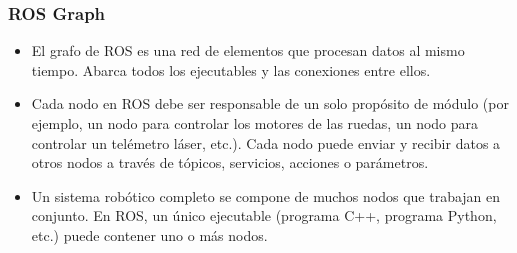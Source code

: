 \begin{frame}
    \frametitle{ROS Graph}
    \scriptsize
   	\begin{center}
    \end{center}
    
    \begin{itemize}
    \item El grafo de ROS es una red de elementos que procesan datos al mismo tiempo. Abarca todos los ejecutables y las conexiones entre ellos.

    \item Cada nodo en ROS debe ser responsable de un solo propósito de módulo (por ejemplo, un nodo para controlar los motores de las ruedas, un nodo para controlar un telémetro láser, etc.). Cada nodo puede enviar y recibir datos a otros nodos a través de tópicos, servicios, acciones o parámetros.

    \item Un sistema robótico completo se compone de muchos nodos que trabajan en conjunto. En ROS, un único ejecutable (programa C++, programa Python, etc.) puede contener uno o más nodos.
    \end{itemize}
    

\end{frame}

